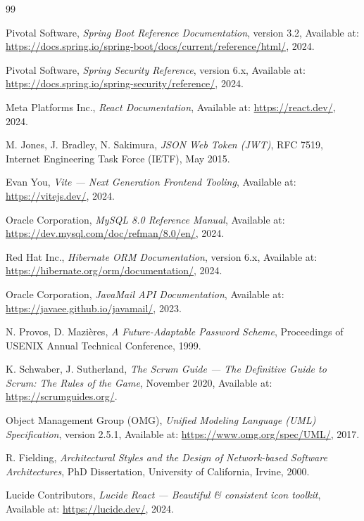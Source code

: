 \begin{thebibliography}{99}

Pivotal Software, \textit{Spring Boot Reference Documentation}, version 3.2,
Available at: \url{https://docs.spring.io/spring-boot/docs/current/reference/html/}, 2024.

Pivotal Software, \textit{Spring Security Reference}, version 6.x,
Available at: \url{https://docs.spring.io/spring-security/reference/}, 2024.

Meta Platforms Inc., \textit{React Documentation},
Available at: \url{https://react.dev/}, 2024.

M. Jones, J. Bradley, N. Sakimura, \textit{JSON Web Token (JWT)}, RFC 7519,
Internet Engineering Task Force (IETF), May 2015.

Evan You, \textit{Vite — Next Generation Frontend Tooling},
Available at: \url{https://vitejs.dev/}, 2024.

Oracle Corporation, \textit{MySQL 8.0 Reference Manual},
Available at: \url{https://dev.mysql.com/doc/refman/8.0/en/}, 2024.

Red Hat Inc., \textit{Hibernate ORM Documentation}, version 6.x,
Available at: \url{https://hibernate.org/orm/documentation/}, 2024.

Oracle Corporation, \textit{JavaMail API Documentation},
Available at: \url{https://javaee.github.io/javamail/}, 2023.

N. Provos, D. Mazières, \textit{A Future-Adaptable Password Scheme},
Proceedings of USENIX Annual Technical Conference, 1999.

K. Schwaber, J. Sutherland, \textit{The Scrum Guide — The Definitive Guide to Scrum: The Rules of the Game},
November 2020, Available at: \url{https://scrumguides.org/}.

Object Management Group (OMG), \textit{Unified Modeling Language (UML) Specification}, version 2.5.1,
Available at: \url{https://www.omg.org/spec/UML/}, 2017.

R. Fielding, \textit{Architectural Styles and the Design of Network-based Software Architectures},
PhD Dissertation, University of California, Irvine, 2000.

Lucide Contributors, \textit{Lucide React — Beautiful \& consistent icon toolkit},
Available at: \url{https://lucide.dev/}, 2024.

\end{thebibliography}
